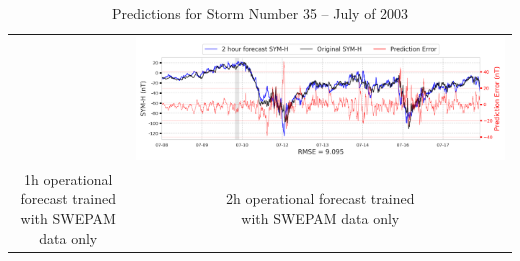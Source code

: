 \documentclass[draft,sw]{agutexSI2019}
\begin{document}
\begin{table}
\begin{tabular}{cc}
&
\includegraphics[width=0.49\linewidth]{paper_plots_shade/2h_swepam_rt/2h_swepam_rt_storm_35.png}
\\
\shortstack{1h operational forecast trained\\ with SWEPAM data only} & \shortstack{2h operational forecast trained\\ with SWEPAM data only}
\vspace*{12pt}
\\
\end{tabular}
\caption{Predictions for Storm Number 35 -- July of 2003}
\label{storm-35}
\end{table}
\end{document}

